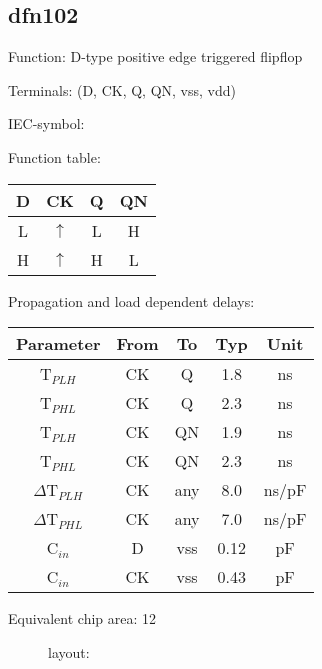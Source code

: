 \subsection{dfn102}
Function: D-type positive edge triggered flipflop

Terminals: (D, CK, Q, QN, vss, vdd)


IEC-symbol:
\begin{figure}[h]
\end{figure}

Function table:
\begin{table}[h]
\begin{tabular}{|c|c||c|c|}
\hline
D	&CK	&Q	&QN\\
\hline
L	&$\uparrow$	&L	&H\\
H	&$\uparrow$	&H	&L\\
\hline
\end{tabular}
\vspace{1cm}

Propagation and load dependent delays:\\

\begin{tabular}{|c|c|c|c|c|}
\hline
Parameter               &From            &To   &Typ    &Unit\\
\hline
T$_{PLH}$               &CK     	&Q      &1.8    &ns\\
T$_{PHL}$               &CK    		&Q      &2.3    &ns\\
T$_{PLH}$               &CK     	&QN     &1.9    &ns\\
T$_{PHL}$               &CK    		&QN     &2.3    &ns\\
\hline
$\Delta$T$_{PLH}$       &CK          	&any    &8.0    &ns/pF\\
$\Delta$T$_{PHL}$       &CK           	&any    &7.0    &ns/pF\\
\hline
C$_{in}$                &D	    	&vss    &0.12   &pF\\
C$_{in}$                &CK	    	&vss    &0.43   &pF\\
\hline
\end{tabular}
\end{table}

Equivalent chip area: 12

\clearpage



\begin{figure}[bth]
layout:\\

\end{figure}


\clearpage
